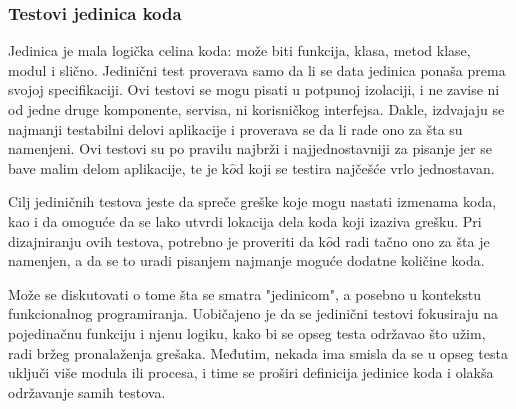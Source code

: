 \documentclass[12pt,oneside]{memoir}
\begin{document}
\subsubsection{Testovi jedinica koda}
\par Jedinica je mala logička celina koda: može biti funkcija, klasa, metod klase, modul i slično. Jedinični test proverava samo da li se data jedinica ponaša prema svojoj specifikaciji. Ovi testovi se mogu pisati u potpunoj izolaciji, i ne zavise ni od jedne druge komponente, servisa, ni korisničkog interfejsa. Dakle, izdvajaju se najmanji testabilni delovi aplikacije i proverava se da li rade ono za šta su namenjeni. Ovi testovi su po pravilu najbrži i  najjednostavniji za pisanje jer se bave malim delom aplikacije, te je k$\hat{o}$d koji se testira najčešće vrlo jednostavan. 
\par Cilj jediničnih testova jeste da spreče greške koje mogu nastati izmenama koda, kao i da omoguće da se lako utvrdi lokacija dela koda koji izaziva grešku. Pri dizajniranju ovih testova, potrebno je proveriti da k$\hat{o}$d radi tačno ono za šta je namenjen, a da se to uradi pisanjem najmanje moguće dodatne količine koda.
\par Može se diskutovati o tome šta se smatra "jedinicom", a posebno u kontekstu funkcionalnog programiranja. Uobičajeno je da se jedinični testovi fokusiraju na pojedinačnu funkciju i njenu logiku, kako bi se opseg testa održavao što užim, radi bržeg pronalaženja grešaka. Međutim, nekada ima smisla da se u opseg testa uključi više modula ili procesa, i time se proširi definicija jedinice koda i olakša održavanje samih testova. 
\end{document}
